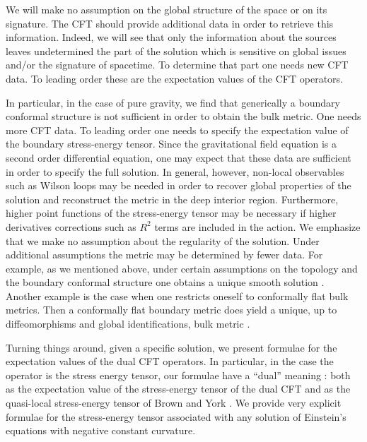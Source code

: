 \documentclass{article}
\begin{document}
We will make no assumption
on the global structure of the space or on its
signature. The CFT should provide additional 
data in order to retrieve this information.
Indeed, we will see that only the information 
about the sources leaves undetermined the 
part of the solution which is sensitive on 
global issues and/or the signature of spacetime.
To determine that part one needs new CFT data.
To leading order these are  
the expectation values of the CFT operators.

In particular, in the case of pure gravity, we find that 
generically a boundary conformal structure 
is not sufficient in order to 
obtain the bulk metric. One needs more CFT data.
To leading order one needs to specify  
the expectation value of the boundary stress-energy tensor.
Since the gravitational field equation is a second
order differential equation, one may expect that these data are sufficient 
in order to specify the full solution.
In general, however, non-local observables such as Wilson loops
may be needed in order to recover global properties of the solution and
reconstruct the metric in the deep interior region. Furthermore, 
higher point functions of the stress-energy tensor
may be necessary if higher derivatives corrections
such as $R^2$ terms are included in the action.
We emphasize that we make no assumption about the regularity 
of the solution. Under additional assumptions 
the metric may be determined by fewer data. 
For example, as we mentioned above, under certain 
assumptions on the topology and the 
boundary conformal structure one obtains 
a unique smooth solution \cite{GrahamLee}.
Another example is the case when
one restricts oneself to conformally
flat bulk metrics. Then a conformally flat boundary metric 
does yield a unique, up to diffeomorphisms and 
global identifications, bulk metric \cite{SkSo}.

Turning things around, given a specific solution,
we present formulae for the expectation values 
of the dual CFT operators. In particular, in the 
case the operator is the stress energy tensor,
our formulae have a ``dual'' meaning \cite{BK}:
both as the expectation value of the 
stress-energy tensor of the dual CFT 
and as the quasi-local stress-energy tensor 
of Brown and York \cite{BrownYork}. We provide very explicit
formulae for the stress-energy tensor associated with
any solution of Einstein's equations with 
negative constant curvature. 
\end{document}
